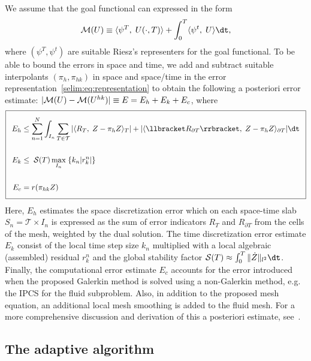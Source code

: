 We assume that the goal functional can expressed in the form
\begin{equation}
\M(U)  \equiv \langle \psi^T,\;  U(\cdot, T) \rangle +
\int_0^T \langle \psi^t,\; U \rangle \dt,
\end{equation}
where $(\psi^T, \psi^t)$ are suitable Riesz's representers for the
goal functional. To be able to bound the errors in space and time, we
add and subtract suitable interpolants $(\pi_h, \pi_{hk})$ in space
and space/time in the error
representation~\eqref{selim:eq:representation} to obtain the following
a posteriori error estimate: $|\mathcal{M}(U) - \mathcal{M}(U^{hk})| \equiv E = E_h +
E_k + E_c$, where
\begin{equation}
\label{selim:eq:aposteriori}
\addtolength{\fboxsep}{5pt} \boxed{
\begin{split}
E_h &\leq \sum_{n=1}^{N}\int_{I_n} \sum_{T\in\mathcal{T}}| \langle
R_T,\; Z - \pi_h Z \rangle_T |+ | \langle \llbracket R_{\partial T}
\rrbracket,\; Z - \pi_h Z \rangle _{\partial T}|\dt\\\\ E_k &\leq
\;\mathcal{S}(T)\max_{I_n}\;\{k_n | r_k ^n|\}\\\\ E_c &=
r(\pi_{hk}Z)
\end{split}
}
\end{equation}
Here, $E_h$ estimates the space discretization error which on each
space-time slab $S_n = \mathcal{T} \times I_n$ is expressed as the sum
of error indicators $R_T$ and $R_{\partial T}$ from the cells of the
mesh, weighted by the dual solution. The time discretization error
estimate $E_k$ consist of the local time step size $k_n$ multiplied
with a local algebraic (assembled) residual $r_k^n$ and the global
stability factor $\mathcal{S}(T) \approx \int_0^T \| \dot{Z}
\|_{l^2}\dt$. Finally, the computational error estimate $E_c$ accounts
for the error introduced when the proposed Galerkin method is solved
using a non-Galerkin method, e.g. the IPCS for the fluid
subproblem. Also, in addition to the proposed mesh equation, an
additional local mesh smoothing is added to the fluid mesh.  For a
more comprehensive discussion and derivation of this a posteriori
estimate, see~\cite{SelimNarayananEtAl2010}.

\subsection{The adaptive algorithm}

